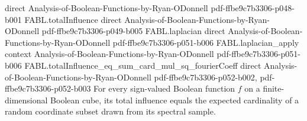 \begin{theorem}
  {direct}
  {Analysis-of-Boolean-Functions-by-Ryan-ODonnell}
  {pdf-ffbe9c7b3306-p048-b001}
\proofstep
  {FABL.totalInfluence}
  {direct}
  {Analysis-of-Boolean-Functions-by-Ryan-ODonnell}
  {pdf-ffbe9c7b3306-p049-b005}
\proofstep
  {FABL.laplacian}
  {direct}
  {Analysis-of-Boolean-Functions-by-Ryan-ODonnell}
  {pdf-ffbe9c7b3306-p051-b006}
\proofstep
  {FABL.laplacian_apply}
  {context}
  {Analysis-of-Boolean-Functions-by-Ryan-ODonnell}
  {pdf-ffbe9c7b3306-p051-b006}
\proofstep
  {FABL.totalInfluence_eq_sum_card_mul_sq_fourierCoeff}
  {direct}
  {Analysis-of-Boolean-Functions-by-Ryan-ODonnell}
  {pdf-ffbe9c7b3306-p052-b002,
    pdf-ffbe9c7b3306-p052-b003}
For every sign-valued Boolean function $f$ on a finite-dimensional Boolean cube, its
total influence equals the expected cardinality of a random coordinate subset drawn from
its spectral sample.
\end{theorem}

